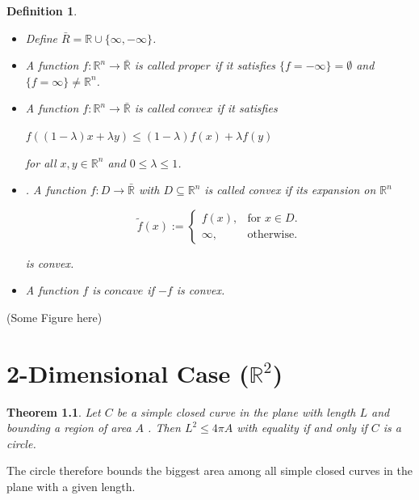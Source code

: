 \documentclass[a4paper]{book}
\newtheorem{theorem}{Theorem}%
\newtheorem{definition}{Definition}%
\begin{document}
\begin{definition}
	\begin{itemize}
		\item Define $\bar{R}=\mathbb{R}\cup\{ \infty,-\infty\}$.
		\item A function $f:\mathbb{R}^n\to\bar{\mathbb{R}}$ is called $proper$ if it satisfies $\{f=-\infty\}=\emptyset$ and $\{f=\infty\}\neq\mathbb{R}^n$.
		\item A function $f:\mathbb{R}^n\to\bar{\mathbb{R}}$ is called $convex$ if it satisfies 
		\begin{center}
			$f((1-\lambda)x+\lambda y)\leq(1-\lambda)f(x)+\lambda f(y)$
		\end{center}
		for all $x, y\in\mathbb{R}^n$ and $0\leq\lambda\leq1$.
		\item . A function $f:D\to\bar{\mathbb{R}}$ with $D\subseteq\mathbb{R}^n$ is called convex if its expansion on $\mathbb{R}^n$
		\begin{center}
			\begin{equation}
				  \tilde{f}(x):=\begin{cases}
				    	f(x), & \text{for $x\in D$}.\\
				   	 \infty, & \text{otherwise}.
				  \end{cases}
			\end{equation}
		\end{center}
		is convex.
		\item A function $f$ is $concave$ if $-f$ is convex.
	\end{itemize}
\end{definition}
(Some Figure here)

\chapter{2-Dimensional Case ($\mathbb{R}^2$)}
\begin{theorem}
    Let $C$ be a simple closed curve in the plane with length $L$ and bounding a region of area $A$ . 
    Then $L^2 \leq 4\pi A$ with equality if and only if $C$ is a circle.
\end{theorem}
The circle therefore bounds the biggest area among all simple closed curves in the plane with a given length.
\end{document}
